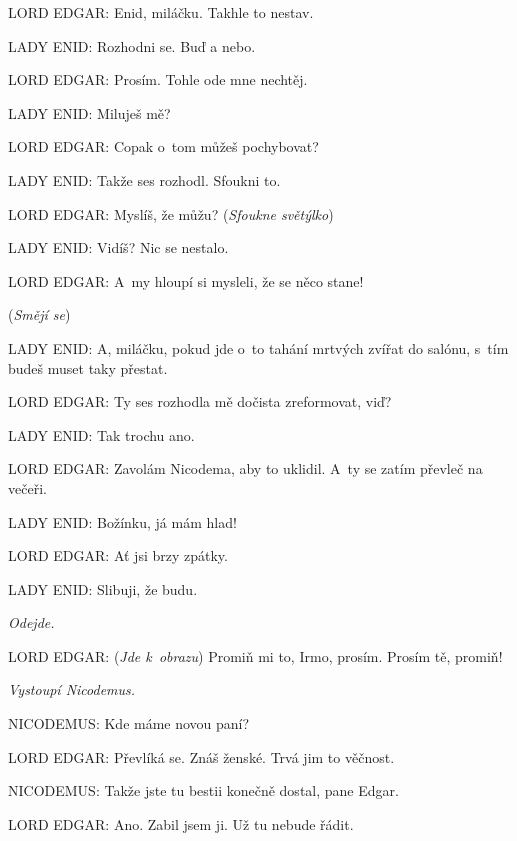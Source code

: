 \noindent
LORD EDGAR: Enid, miláčku. Takhle to nestav.

\noindent
LADY ENID: Rozhodni se. Buď a nebo.

\noindent
LORD EDGAR: Prosím. Tohle ode mne nechtěj.

\noindent
LADY ENID: Miluješ mě?

\noindent
LORD EDGAR: Copak o~tom můžeš pochybovat?

\noindent
LADY ENID: Takže ses rozhodl. Sfoukni to.

\noindent
LORD EDGAR: Myslíš, že můžu? (\textit{Sfoukne světýlko})

\noindent
LADY ENID: Vidíš? Nic se nestalo.

\noindent
LORD EDGAR: A~my hloupí si mysleli, že se něco stane!

\smallskip

\noindent
(\textit{Smějí se})

\smallskip

\noindent
LADY ENID: A, miláčku, pokud jde o~to tahání mrtvých zvířat do salónu, s tím budeš muset taky přestat.

\noindent
LORD EDGAR: Ty ses rozhodla mě dočista zreformovat, viď?

\noindent
LADY ENID: Tak trochu ano.

\noindent
LORD EDGAR: Zavolám Nicodema, aby to uklidil. A~ty se zatím převleč na večeři.

\noindent
LADY ENID: Božínku, já mám hlad!

\noindent
LORD EDGAR: Ať jsi brzy zpátky.

\noindent
LADY ENID: Slibuji, že budu.

\smallskip

\noindent
\textit{Odejde.}

\smallskip

\noindent
LORD EDGAR: (\textit{Jde k obrazu}) Promiň mi to, Irmo, prosím. Prosím tě, promiň!

\smallskip

\noindent
\textit{Vystoupí Nicodemus.}

\smallskip

\noindent
NICODEMUS: Kde máme novou paní?

\noindent
LORD EDGAR: Převlíká se. Znáš ženské. Trvá jim to věčnost.

\noindent
NICODEMUS: Takže jste tu bestii konečně dostal, pane Edgar.

\noindent
LORD EDGAR: Ano. Zabil jsem ji. Už tu nebude řádit.

